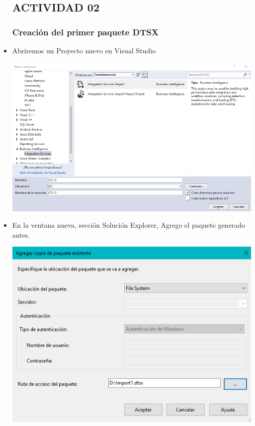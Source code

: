 \begin{itemize}
\subsection{ACTIVIDAD 02}

\subsubsection{Creación del primer paquete DTSX}

		\item Abriremos un Proyecto nuevo en Visual Studio

	\begin{center}
	\includegraphics[width=14cm]{./Imagenes/tarea2_1}
	\end{center}

\item En la ventana nueva, sección Solución Explorer, Agrego el paquete generado antes.

	\begin{center}
	\includegraphics[width=14cm]{./Imagenes/tarea2_2}
	\end{center}


\end{itemize}
